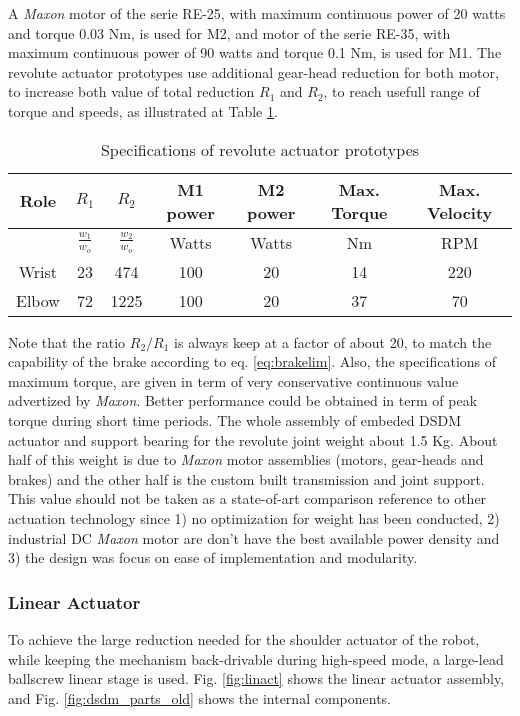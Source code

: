 A \textit{Maxon} motor of the serie RE-25, with maximum continuous power of 20 watts and torque 0.03 Nm, is used for M2, and motor of the serie RE-35, with maximum continuous power of 90 watts and torque 0.1 Nm, is used for M1. The revolute actuator prototypes use additional gear-head reduction for both motor, to increase both value of total reduction $R_1$ and $R_2$, to reach usefull range of torque and speeds, as illustrated at Table \ref{tab:specrev}. 
%
\begin{table}[htbp]
	\centering
	\caption{Specifications of revolute actuator prototypes}
		\begin{tabular}{ c c c c c c c}
			\hline
			Role & $R_1$ & $R_2$ & M1 power & M2 power & Max. Torque & Max. Velocity \\
			\hline
			       & $\frac{w_1}{w_o}$ & $\frac{w_2}{w_o}$ & Watts & Watts & Nm & RPM \\
			\hline \hline
			Wrist & 23 & 474  & 100 & 20 & 14 & 220 \\
			Elbow & 72 & 1225 & 100 & 20 & 37 & 70 \\
			\hline
		\end{tabular}
	\label{tab:specrev}
\end{table}
 
Note that the ratio $R_2/R_1$ is always keep at a factor of about 20, to match the capability of the brake according to eq. \eqref{eq:brakelim}. Also, the specifications of maximum torque, are given in term of very conservative continuous value advertized by \textit{Maxon}. Better performance could be obtained in term of peak torque during short time periods. The whole assembly of embeded DSDM actuator and support bearing for the revolute joint weight about 1.5 Kg. About half of this weight is due to \textit{Maxon} motor assemblies (motors, gear-heads and brakes) and the other half is the custom built transmission and joint support. This value should not be taken as a state-of-art comparison reference to other actuation technology since 1) no optimization for weight has been conducted, 2) industrial DC \textit{Maxon} motor are don't have the best available power density and 3) the design was focus on ease of implementation and modularity. 


\subsubsection{Linear Actuator}

To achieve the large reduction needed for the shoulder actuator of the robot, while keeping the mechanism back-drivable during high-speed mode, a large-lead ballscrew linear stage is used. Fig. \ref{fig:linact} shows the linear actuator assembly, and Fig. \ref{fig:dsdm_parts_old} shows the internal components. 

